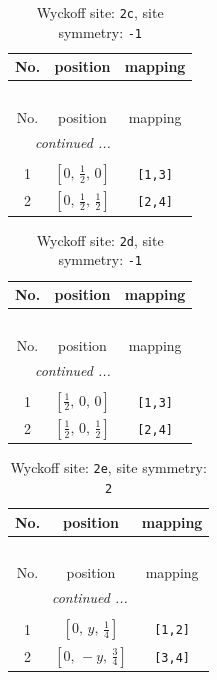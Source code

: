 \documentclass[fleqn,8pt]{jsarticle}
\begin{document}
\begin{longtable}{ccc}
\caption{Wyckoff site: {\tt 2c}, site symmetry: {\tt -1}}
 \\
 \hline \hline
No. & position & mapping \\ \hline \endfirsthead

\multicolumn{2}{l}{\tablename\ \thetable{}} \\
 \hline \hline
No. & position & mapping \\ \hline \endhead

 \hline \hline
\multicolumn{2}{r}{\footnotesize\it continued ...} \\ \endfoot

 \hline \hline
\multicolumn{2}{r}{} \\ \endlastfoot

1 & $\left[ 0,\, \frac{1}{2},\, 0 \right]$ & {\tt [1,3]} \\ \hline
2 & $\left[ 0,\, \frac{1}{2},\, \frac{1}{2} \right]$ & {\tt [2,4]} \\
\end{longtable}
\renewcommand{\arraystretch}{1.2}
\begin{longtable}{ccc}
\caption{Wyckoff site: {\tt 2d}, site symmetry: {\tt -1}}
 \\
 \hline \hline
No. & position & mapping \\ \hline \endfirsthead

\multicolumn{2}{l}{\tablename\ \thetable{}} \\
 \hline \hline
No. & position & mapping \\ \hline \endhead

 \hline \hline
\multicolumn{2}{r}{\footnotesize\it continued ...} \\ \endfoot

 \hline \hline
\multicolumn{2}{r}{} \\ \endlastfoot

1 & $\left[ \frac{1}{2},\, 0,\, 0 \right]$ & {\tt [1,3]} \\ \hline
2 & $\left[ \frac{1}{2},\, 0,\, \frac{1}{2} \right]$ & {\tt [2,4]} \\
\end{longtable}
\renewcommand{\arraystretch}{1.2}
\begin{longtable}{ccc}
\caption{Wyckoff site: {\tt 2e}, site symmetry: {\tt 2}}
 \\
 \hline \hline
No. & position & mapping \\ \hline \endfirsthead

\multicolumn{2}{l}{\tablename\ \thetable{}} \\
 \hline \hline
No. & position & mapping \\ \hline \endhead

 \hline \hline
\multicolumn{2}{r}{\footnotesize\it continued ...} \\ \endfoot

 \hline \hline
\multicolumn{2}{r}{} \\ \endlastfoot

1 & $\left[ 0,\, y,\, \frac{1}{4} \right]$ & {\tt [1,2]} \\ \hline
2 & $\left[ 0,\, - y,\, \frac{3}{4} \right]$ & {\tt [3,4]} \\
\end{longtable}
\end{document}
